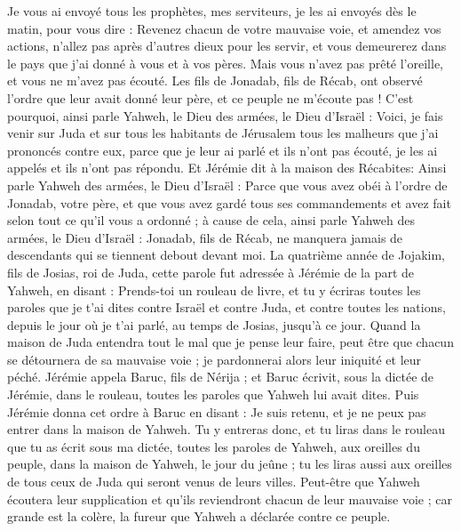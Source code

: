 \begin{multicols}{2}
Je vous ai envoyé tous les prophètes, mes serviteurs, je les ai envoyés dès le matin, pour vous dire : Revenez chacun de votre mauvaise voie, et amendez vos actions, n'allez pas après d'autres dieux pour les servir, et vous demeurerez dans le pays que j'ai donné à vous et à vos pères. Mais vous n'avez pas prêté l'oreille, et vous ne m'avez pas écouté.
Les fils de Jonadab, fils de Récab, ont observé l'ordre que leur avait donné leur père, et ce peuple ne m'écoute pas !
C'est pourquoi, ainsi parle Yahweh, le Dieu des armées, le Dieu d'Israël : Voici, je fais venir sur Juda et sur tous les habitants de Jérusalem tous les malheurs que j'ai prononcés contre eux, parce que je leur ai parlé et ils n'ont pas écouté, je les ai appelés et ils n'ont pas répondu.
Et Jérémie dit à la maison des Récabites: Ainsi parle Yahweh des armées, le Dieu d'Israël : Parce que vous avez obéi à l'ordre de Jonadab, votre père, et que vous avez gardé tous ses commandements et avez fait selon tout ce qu'il vous a ordonné ;
à cause de cela, ainsi parle Yahweh des armées, le Dieu d'Israël : Jonadab, fils de Récab, ne manquera jamais de descendants qui se tiennent debout devant moi.
\VerseOne{}La quatrième année de Jojakim, fils de Josias, roi de Juda, cette parole fut adressée à Jérémie de la part de Yahweh, en disant :
Prends-toi un rouleau de livre, et tu y écriras toutes les paroles que je t'ai dites contre Israël et contre Juda, et contre toutes les nations, depuis le jour où je t'ai parlé, au temps de Josias, jusqu'à ce jour.
Quand la maison de Juda entendra tout le mal que je pense leur faire, peut être que chacun se détournera de sa mauvaise voie ; je pardonnerai alors leur iniquité et leur péché.
Jérémie appela Baruc, fils de Nérija ; et Baruc écrivit, sous la dictée de Jérémie, dans le rouleau, toutes les paroles que Yahweh lui avait dites.
Puis Jérémie donna cet ordre à Baruc en disant : Je suis retenu, et je ne peux pas entrer dans la maison de Yahweh.
Tu y entreras donc, et tu liras dans le rouleau que tu as écrit sous ma dictée, toutes les paroles de Yahweh, aux oreilles du peuple, dans la maison de Yahweh, le jour du jeûne ; tu les liras aussi aux oreilles de tous ceux de Juda qui seront venus de leurs villes.
Peut-être que Yahweh écoutera leur supplication et qu'ils reviendront chacun de leur mauvaise voie ; car grande est la colère, la fureur que Yahweh a déclarée contre ce peuple.

\end{multicols}

